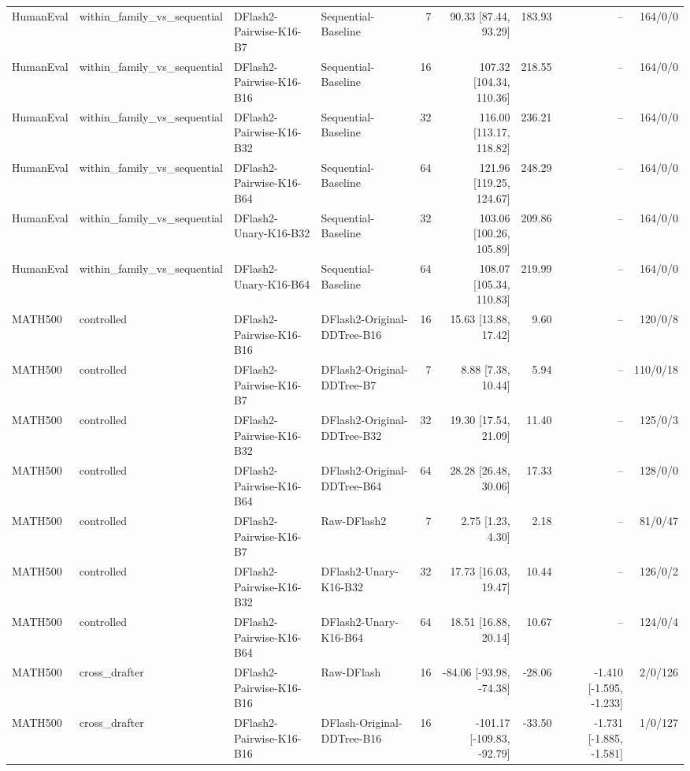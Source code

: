 \begin{longtable}{llllrrrrr}
HumanEval & within\_family\_vs\_sequential & DFlash2-Pairwise-K16-B7 & Sequential-Baseline & 7 & 90.33 [87.44, 93.29] & 183.93 & -- & 164/0/0 \\
HumanEval & within\_family\_vs\_sequential & DFlash2-Pairwise-K16-B16 & Sequential-Baseline & 16 & 107.32 [104.34, 110.36] & 218.55 & -- & 164/0/0 \\
HumanEval & within\_family\_vs\_sequential & DFlash2-Pairwise-K16-B32 & Sequential-Baseline & 32 & 116.00 [113.17, 118.82] & 236.21 & -- & 164/0/0 \\
HumanEval & within\_family\_vs\_sequential & DFlash2-Pairwise-K16-B64 & Sequential-Baseline & 64 & 121.96 [119.25, 124.67] & 248.29 & -- & 164/0/0 \\
HumanEval & within\_family\_vs\_sequential & DFlash2-Unary-K16-B32 & Sequential-Baseline & 32 & 103.06 [100.26, 105.89] & 209.86 & -- & 164/0/0 \\
HumanEval & within\_family\_vs\_sequential & DFlash2-Unary-K16-B64 & Sequential-Baseline & 64 & 108.07 [105.34, 110.83] & 219.99 & -- & 164/0/0 \\
MATH500 & controlled & DFlash2-Pairwise-K16-B16 & DFlash2-Original-DDTree-B16 & 16 & 15.63 [13.88, 17.42] & 9.60 & -- & 120/0/8 \\
MATH500 & controlled & DFlash2-Pairwise-K16-B7 & DFlash2-Original-DDTree-B7 & 7 & 8.88 [7.38, 10.44] & 5.94 & -- & 110/0/18 \\
MATH500 & controlled & DFlash2-Pairwise-K16-B32 & DFlash2-Original-DDTree-B32 & 32 & 19.30 [17.54, 21.09] & 11.40 & -- & 125/0/3 \\
MATH500 & controlled & DFlash2-Pairwise-K16-B64 & DFlash2-Original-DDTree-B64 & 64 & 28.28 [26.48, 30.06] & 17.33 & -- & 128/0/0 \\
MATH500 & controlled & DFlash2-Pairwise-K16-B7 & Raw-DFlash2 & 7 & 2.75 [1.23, 4.30] & 2.18 & -- & 81/0/47 \\
MATH500 & controlled & DFlash2-Pairwise-K16-B32 & DFlash2-Unary-K16-B32 & 32 & 17.73 [16.03, 19.47] & 10.44 & -- & 126/0/2 \\
MATH500 & controlled & DFlash2-Pairwise-K16-B64 & DFlash2-Unary-K16-B64 & 64 & 18.51 [16.88, 20.14] & 10.67 & -- & 124/0/4 \\
MATH500 & cross\_drafter & DFlash2-Pairwise-K16-B16 & Raw-DFlash & 16 & -84.06 [-93.98, -74.38] & -28.06 & -1.410 [-1.595, -1.233] & 2/0/126 \\
MATH500 & cross\_drafter & DFlash2-Pairwise-K16-B16 & DFlash-Original-DDTree-B16 & 16 & -101.17 [-109.83, -92.79] & -33.50 & -1.731 [-1.885, -1.581] & 1/0/127 \\

\end{longtable}
